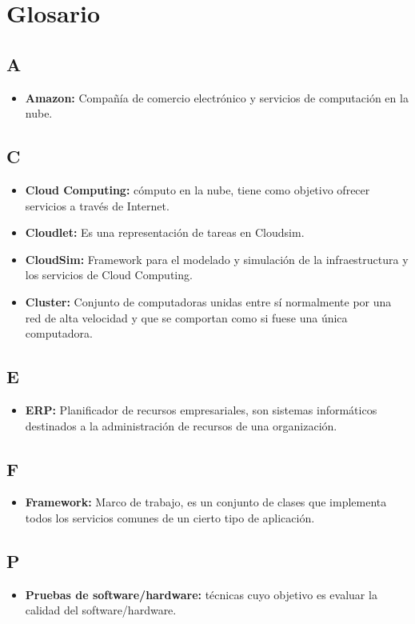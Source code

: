 \chead{}
\rhead{\thepage}

\chapter*{Glosario}
\section*{A}
\begin{itemize}
	\item \textbf{Amazon:} Compañ\'ia de comercio electr\'onico y servicios de computaci\'on en la nube.
\end{itemize}

\section*{C}

\begin{itemize}
	\item \textbf{Cloud Computing:} c\'omputo en la nube, tiene como objetivo ofrecer servicios a trav\'es de Internet.
	\item \textbf{Cloudlet:} Es una representaci\'on de tareas en Cloudsim.
	\item \textbf{CloudSim:} Framework para el modelado y simulaci\'on de la infraestructura y los servicios de Cloud Computing.
	\item \textbf{Cluster:} Conjunto de computadoras unidas entre s\'i normalmente por una red de alta velocidad y que se comportan como si fuese una \'unica computadora.
	
		
	
\end{itemize}
\section*{E}
\begin{itemize}
	\item \textbf{ERP:} Planificador de recursos empresariales, son sistemas inform\'aticos destinados a la administraci\'on de recursos de una organizaci\'on.
	
	
\end{itemize}


\section*{F}
\begin{itemize}
	\item \textbf{Framework:} Marco de trabajo, es un conjunto de clases que implementa todos los servicios comunes de un cierto tipo de aplicaci\'on.
\end{itemize}


\section*{P}
\begin{itemize}
	\item \textbf{Pruebas de software/hardware:} t\'ecnicas cuyo objetivo es evaluar la calidad del software/hardware.

\end{itemize}





